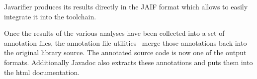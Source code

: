 Javarifier produces its results directly in the JAIF format which allows to
easily integrate it into the toolchain.

Once the results of the various analyses have been collected into a set of
annotation files, the annotation file utilities~\cite{AFU} merge
those annotations back into the original library source. The annotated source
code is now one of the output formats. Additionally Javadoc also extracts 
these annotations and puts them into the html documentation.